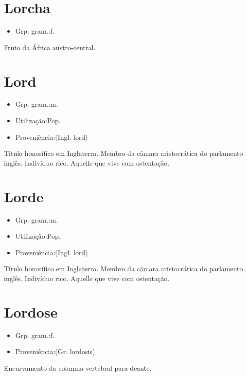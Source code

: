 \section{Lorcha}
\begin{itemize}
\item {Grp. gram.:f.}
\end{itemize}
Fruto da África austro-central.
\section{Lord}
\begin{itemize}
\item {Grp. gram.:m.}
\end{itemize}
\begin{itemize}
\item {Utilização:Pop.}
\end{itemize}
\begin{itemize}
\item {Proveniência:(Ingl. \textunderscore lord\textunderscore )}
\end{itemize}
Título honorífico em Inglaterra.
Membro da câmara aristocrática do parlamento inglês.
Indivíduo rico.
Aquelle que vive com ostentação.
\section{Lorde}
\begin{itemize}
\item {Grp. gram.:m.}
\end{itemize}
\begin{itemize}
\item {Utilização:Pop.}
\end{itemize}
\begin{itemize}
\item {Proveniência:(Ingl. \textunderscore lord\textunderscore )}
\end{itemize}
Título honorífico em Inglaterra.
Membro da câmara aristocrática do parlamento inglês.
Indivíduo rico.
Aquelle que vive com ostentação.
\section{Lordose}
\begin{itemize}
\item {Grp. gram.:f.}
\end{itemize}
\begin{itemize}
\item {Proveniência:(Gr. \textunderscore lordosis\textunderscore )}
\end{itemize}
Encurvamento da columna vertebral para deante.
